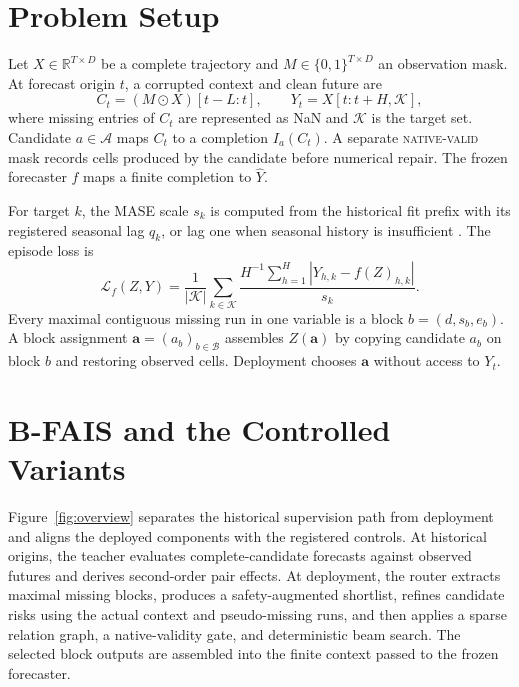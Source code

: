 \documentclass{article}
\newcommand{\native}{\textsc{native-valid}\xspace}
\begin{document}
\section{Problem Setup}
\label{sec:problem}

Let $X\in\mathbb{R}^{T\times D}$ be a complete trajectory and $M\in\{0,1\}^{T\times D}$ an observation mask. At forecast origin $t$, a corrupted context and clean future are
\begin{equation}
 C_t=(M\odot X)[t-L:t], \qquad
 Y_t=X[t:t+H,\mathcal K],
\end{equation}
where missing entries of $C_t$ are represented as NaN and $\mathcal K$ is the target set. Candidate $a\in\mathcal A$ maps $C_t$ to a completion $I_a(C_t)$. A separate \native mask records cells produced by the candidate before numerical repair. The frozen forecaster $f$ maps a finite completion to $\widehat Y$.

For target $k$, the MASE scale $s_k$ is computed from the historical fit prefix with its registered seasonal lag $q_k$, or lag one when seasonal history is insufficient \citep{hyndman2006another}. The episode loss is
\begin{equation}
 \mathcal L_f(Z,Y)=\frac{1}{|\mathcal K|}\sum_{k\in\mathcal K}
 \frac{H^{-1}\sum_{h=1}^{H}|Y_{h,k}-f(Z)_{h,k}|}{s_k}.
 \label{eq:mase}
\end{equation}
Every maximal contiguous missing run in one variable is a block $b=(d,s_b,e_b)$. A block assignment $\mathbf a=(a_b)_{b\in\mathcal B}$ assembles $Z(\mathbf a)$ by copying candidate $a_b$ on block $b$ and restoring observed cells. Deployment chooses $\mathbf a$ without access to $Y_t$.

\section{B-FAIS and the Controlled Variants}
\label{sec:method}

Figure~\ref{fig:overview} separates the historical supervision path from deployment and aligns the deployed components with the registered controls. At historical origins, the teacher evaluates complete-candidate forecasts against observed futures and derives second-order pair effects. At deployment, the router extracts maximal missing blocks, produces a safety-augmented shortlist, refines candidate risks using the actual context and pseudo-missing runs, and then applies a sparse relation graph, a native-validity gate, and deterministic beam search. The selected block outputs are assembled into the finite context passed to the frozen forecaster.
\end{document}
